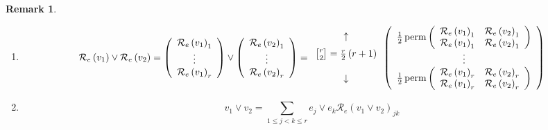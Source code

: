 \documentclass[aps,preprint]{revtex4}%
\newtheorem{remark}[theorem]{Remark}
\begin{document}
\begin{remark}
\begin{enumerate}
\begin{enumerate}
\item
\begin{equation}
\mathcal{R}_{e}\left(  v_{1}\right)  \vee\mathcal{R}_{e}\left(  v_{2}\right)
=\left(
\begin{array}
[c]{c}%
\mathcal{R}_{e}\left(  v_{1}\right)  _{1}\\
\vdots\\
\mathcal{R}_{e}\left(  v_{1}\right)  _{r}%
\end{array}
\right)  \vee\left(
\begin{array}
[c]{c}%
\mathcal{R}_{e}\left(  v_{2}\right)  _{1}\\
\vdots\\
\mathcal{R}_{e}\left(  v_{2}\right)  _{r}%
\end{array}
\right)  =%
\begin{array}
[c]{c}%
\uparrow\\
\underset{\underset{}{}}{\overset{\overset{}{}}{%
\genfrac{[}{]}{0pt}{}{r}{2}%
=\frac{r}{2}\left(  r+1\right)  }}\\
\downarrow
\end{array}
\left(
\begin{array}
[c]{c}%
\frac{1}{2}\operatorname*{perm}\left(
\begin{array}
[c]{cc}%
\mathcal{R}_{e}\left(  v_{1}\right)  _{1} & \mathcal{R}_{e}\left(
v_{2}\right)  _{1}\\
\mathcal{R}_{e}\left(  v_{1}\right)  _{1} & \mathcal{R}_{e}\left(
v_{2}\right)  _{1}%
\end{array}
\right) \\
\vdots\\
\frac{1}{2}\operatorname*{perm}\left(
\begin{array}
[c]{cc}%
\mathcal{R}_{e}\left(  v_{1}\right)  _{r} & \mathcal{R}_{e}\left(
v_{2}\right)  _{r}\\
\mathcal{R}_{e}\left(  v_{1}\right)  _{r} & \mathcal{R}_{e}\left(
v_{2}\right)  _{r}%
\end{array}
\right)
\end{array}
\right)
\end{equation}


\item
\begin{equation}
v_{1}\vee v_{2}=\sum\limits_{1\leq j<k\leq r}e_{j}\vee e_{k}\mathcal{R}%
_{e}\left(  v_{1}\vee v_{2}\right)  _{jk}%
\end{equation}

\end{enumerate}
\end{enumerate}
\end{remark}
\end{document}
